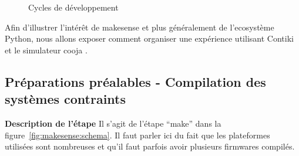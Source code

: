 \begin{figure}
\caption{Cycles de développement}\label{fig:automation:development_workflow}
\end{figure}


Afin d'illustrer l'intérêt de makesense et plus généralement de l'ecosystème
Python, nous allons exposer comment organiser une expérience utilisant Contiki
\cite{dunkels2004contiki} et le simulateur cooja \cite{cooja}.

\subsection{Préparations préalables - Compilation des systèmes contraints} %
\label{sub:subsection_name}

\textbf{Description de l'étape} Il s'agit de  l'étape ``make'' dans la
figure~\ref{fig:makesense:schema}. Il faut parler ici du fait que les plateformes
utilisées sont nombreuses et qu'il faut parfois avoir plusieurs firmwares compilés.


